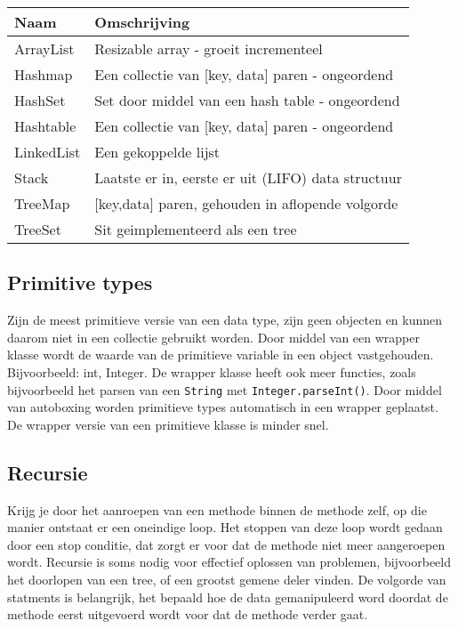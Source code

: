 \begin{center}
    \begin{tabular}{ll}
        Naam        & Omschrijving \\
        \midrule
        ArrayList   & Resizable  array - groeit incrementeel \\
        Hashmap     & Een collectie van [key, data] paren - ongeordend \\
        HashSet     & Set door middel van een hash table - ongeordend \\
        Hashtable   & Een collectie van [key, data] paren - ongeordend \\
        LinkedList  & Een gekoppelde lijst \\
        Stack       & Laatste er in, eerste er uit (LIFO) data structuur \\
        TreeMap     & [key,data] paren, gehouden in aflopende volgorde \\
        TreeSet     & Sit geimplementeerd als een tree \\
        \bottomrule
    \end{tabular}
\end{center}

\subsection{Primitive types}
Zijn de meest primitieve versie van een data type, zijn geen objecten en kunnen daarom niet in een collectie gebruikt worden.
Door middel van een wrapper klasse wordt de waarde van de primitieve variable in een object vastgehouden.
Bijvoorbeeld: int, Integer.
De wrapper klasse heeft ook meer functies, zoals bijvoorbeeld het parsen van een \texttt{String} met \texttt{Integer.parseInt()}.
Door middel van autoboxing worden primitieve types automatisch in een wrapper geplaatst.
De wrapper versie van een primitieve klasse is minder snel.

\subsection{Recursie}
Krijg je door het aanroepen van een methode binnen de methode zelf, op die manier ontstaat er een oneindige loop.
Het stoppen van deze loop wordt gedaan door een stop conditie, dat zorgt er voor dat de methode niet meer aangeroepen wordt.
Recursie is soms nodig voor effectief oplossen van problemen, bijvoorbeeld het doorlopen van een tree, of een grootst gemene deler vinden.
De volgorde van statments is belangrijk, het bepaald hoe de data gemanipuleerd word doordat de methode eerst uitgevoerd wordt voor dat de methode verder gaat.

